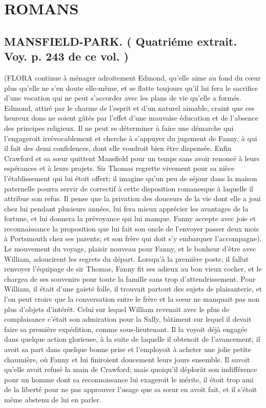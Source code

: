 \setcounter{page}{379}
\chapter{ROMANS}
\section{MANSFIELD-PARK. \large{( Quatriéme extrait. Voy. p. 243 de ce vol. )}}
(FLORA continue à ménager adroitement Edmond, qu’elle aime au fond du cœur plus qu’elle ne s’en doute elle-même, et se flatte toujours qu’il lui fera le sacrifice d’une vocation qui ne peut s’accorder avec les plans de vie qu’elle a formés. Edmond, attiré par le charme de l’esprit et d’un naturel aimable, craint que ces heureux dons ne soient gâtés par l’effet d’une mauvaise éducation et de l’absence des principes religieux.
Il ne peut se déterminer à faire une démarche qui l’engageroit irrévocablement et cherche à s’appuyer du jugement de Fanny, à qui il fait des demi confidences, dont elle voudroit bien être dispensée. Enfin Crawford et sa sœur quittent Mansfield pour un temps sans avoir renoncé à leurs espérances et à leurs projets.
Sir Thomas regrette vivement pour sa nièce l’établissement qui lui étoit offert; il\setcounter{page}{380} imagine qu'un peu de séjour dans la maison paternelle pourra servir de correctif à cette disposition romanesque à laquelle il attribue son refus. Il pense que la privation des douceurs de la vie dont elle a joui chez lui pendant plusieurs années, lui fera mieux apprécier les avantages de la fortune, et lui donnera la prévoyance qui lui manque.
Fanny accepte avec joie et reconnaissance la proposition que lui fait son oncle de l'envoyer passer deux mois à Portsmouth chez ses parents; et son frère qui doit s'y embarquer l'accompagne).
Le mouvement du voyage, plaisir nouveau pour Fanny, et le bonheur d'être avec William, adoucirent les regrets du départ. Lorsqu'à la première poste, il fallut renvoyer l'équipage de sir Thomas, Fanny fit ses adieux au bon vieux cocher, et le chargea de ses souvenirs pour toute la famille sans trop d'attendrissement.
Pour William, il était d'une gaieté folle, il trouvait partout des sujets de plaisanterie, et l'on peut croire que la conversation entre le frère et la sœur ne manquait pas non plus d'objets d'intérêt. Celui sur lequel William revenait avec le plus de complaisance c'était son admiration pour la Sally, bâtiment sur lequel il devait faire sa première\setcounter{page}{381} expédition, comme sous-lieutenant. Il la voyoit déjà engagée dans quelque action glorieuse, à la suite de laquelle il obtenoit de l'avancement; il avoit sa part dans quelque bonne prise et l'employoit à acheter une jolie petite chaumière, où Fanny et lui finiroient doucement leurs jours ensemble. Il savoit qu'elle avoit refusé la main de Crawford; mais quoiqu'il déplorât son indifférence pour un homme dont sa reconnoissance lui exageroit le mérite, il étoit trop ami de la liberté pour ne pas approuver l'usage que sa sœur en avoit fait, et il s'étoit même abstenu de lui en parler.

